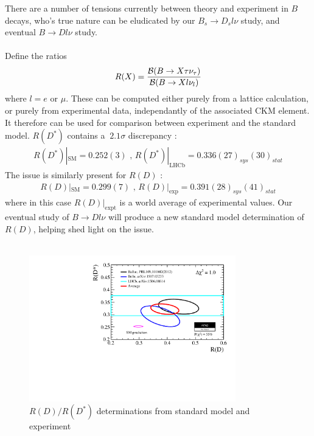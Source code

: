 \documentclass[a4paper,10pt]{article}
\numberwithin{equation}{section}
\begin{document}
There are a number of tensions currently between theory and experiment in $B$ decays, who's true nature can be eludicated by our $B_s\to D_s l\nu$ study, and eventual $B\to Dl\nu$ study.
\\ \\
Define the ratios
\begin{align}
	R(X) = {\mathcal{B}(B\to X \tau \nu_{\tau}) \over \mathcal{B}(B\to X l \nu_l)}
\end{align}
where $l=e$ or $\mu$. These can be computed either purely from a lattice calculation, or purely from experimental data, independantly of the associated CKM element. It therefore can be used for comparison between experiment and the standard model. $R(D^*)$ contains a $~2.1\sigma$ discrepancy \cite{Aaij:2015yra}:
\begin{align}
	R(D^*)|_{\text{SM}} = 0.252(3) \text{ , } R(D^*)|_{\text{LHCb}} = 0.336(27)_{sys}(30)_{stat}
\end{align}
The issue is similarly present for $R(D)$ \cite{Monahan:2017uby}:
\begin{align}
	R(D)|_{\text{SM}} = 0.299(7) \text{ , } R(D)|_{\text{exp}} = 0.391(28)_{sys}(41)_{stat}
\end{align}
where in this case $R(D)|_{\text{expt}}$ is a world average of experimental values. Our eventual study of $B\to Dl\nu$ will produce a new standard model determination of $R(D)$, helping shed light on the issue.
\\ \\
\begin{figure}
  \begin{center}
    \includegraphics[width=
   0.8\textwidth]{rdrds_eps15.pdf}
  \end{center}
  \caption{$R(D)/R(D^*)$ determinations from standard model and experiment \cite{HFAG}}
  \label{fig:semileptonic}
\end{figure}
\end{document}

